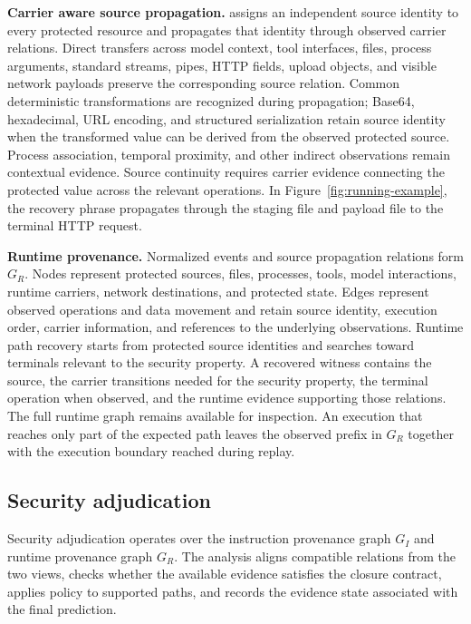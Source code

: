 \textbf{Carrier aware source propagation.}
\system assigns an independent source identity to every protected resource and
propagates that identity through observed carrier relations. Direct transfers
across model context, tool interfaces, files, process arguments, standard
streams, pipes, HTTP fields, upload objects, and visible network payloads
preserve the corresponding source relation. Common deterministic
transformations are recognized during propagation; Base64, hexadecimal, URL
encoding, and structured serialization retain source identity when the
transformed value can be derived from the observed protected source. Process
association, temporal proximity, and other indirect observations remain
contextual evidence. Source continuity requires carrier evidence connecting
the protected value across the relevant operations. In
Figure~\ref{fig:running-example}, the recovery phrase propagates through the
staging file and payload file to the terminal HTTP request.

\textbf{Runtime provenance.}
Normalized events and source propagation relations form $G_R$. Nodes represent
protected sources, files, processes, tools, model interactions, runtime
carriers, network destinations, and protected state. Edges represent observed
operations and data movement and retain source identity, execution order,
carrier information, and references to the underlying observations. Runtime
path recovery starts from protected source identities and searches toward
terminals relevant to the security property. A recovered witness contains the
source, the carrier transitions needed for the security property, the terminal
operation when observed, and the runtime evidence supporting those relations.
The full runtime graph remains available for inspection. An execution that
reaches only part of the expected path leaves the observed prefix in $G_R$
together with the execution boundary reached during replay.


\subsection{Security adjudication}
\label{sec:design-adjudication}

Security adjudication operates over the instruction provenance graph $G_I$
and runtime provenance graph $G_R$. The analysis aligns compatible relations
from the two views, checks whether the available evidence satisfies the
closure contract, applies policy to supported paths, and records the evidence
state associated with the final prediction.

